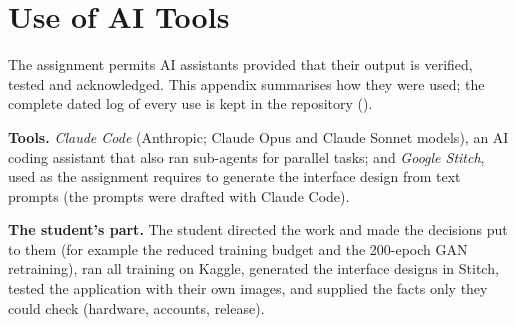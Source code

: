 \documentclass[conference]{IEEEtran}
\DeclareRobustCommand{\file}[1]{\expandafter\filepath\expandafter{\detokenize{#1}}}
\begin{document}
\appendices

\section{Use of AI Tools}
\label{app:ai}

The assignment permits AI assistants provided that their output is verified,
tested and acknowledged. This appendix summarises how they were used; the
complete dated log of every use is kept in the repository
(\file{docs/ai_use_log.md}).

\textbf{Tools.} \emph{Claude Code} (Anthropic; Claude Opus and Claude Sonnet
models), an AI coding assistant that also ran sub-agents for parallel tasks;
and \emph{Google Stitch}, used as the assignment requires to generate the
interface design from text prompts (the prompts were drafted with Claude Code).

\textbf{The student's part.} The student directed the work and made the
decisions put to them (for example the reduced training budget and the
200-epoch GAN retraining), ran all training on Kaggle, generated the
interface designs in Stitch, tested the application with their own images,
and supplied the facts only they could check (hardware, accounts, release).
\end{document}
